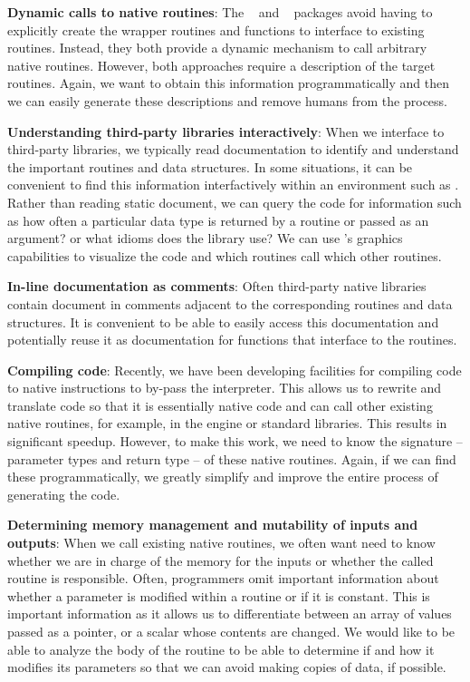 \documentclass[article]{jss}
\def\C{\proglang{C}}
\def\R{\proglang{R}}
\def\Rpkg#1{\pkg{#1}}
\begin{document}
\textbf{Dynamic calls to native routines}: The
\Rpkg{rdyncall}~\cite{bib:rdyncall} and \Rpkg{Rffi}~\cite{bib:Rffi}
\R{} packages avoid having to explicitly create the wrapper routines
and \R{} functions to interface to existing \C{} routines. Instead,
they both provide a dynamic mechanism to call arbitrary native
routines.  However, both approaches require a description of the
target routines.  Again, we want to obtain this information
programmatically and then we can easily generate these descriptions
and remove humans from the process.

\textbf{Understanding third-party libraries interactively}: When we
interface to third-party libraries, we typically read documentation to
identify and understand the important routines and data structures.
In some situations, it can be convenient to find this information
interfactively within an environment such as \R.  Rather than reading
static document, we can query the code for information such as how
often a particular data type is returned by a routine or passed as an
argument? or what idioms does the library use?  We can use \R's
graphics capabilities to visualize the code and which routines call
which other routines.

\textbf{In-line documentation as comments}: Often third-party native
libraries contain document in comments adjacent to the corresponding
routines and data structures.  It is convenient to be able to easily
access this documentation and potentially reuse it as \R{}
documentation for functions that interface to the routines.

\textbf{Compiling \R{} code}:  Recently, we have been developing \R{} facilities for compiling \R{}
code to native instructions to by-pass the \R{} interpreter.  This
allows us to rewrite and translate \R{} code so that it is essentially
native code and can call other existing native routines, for example,
in the \R{} engine or standard \C{} libraries.  This results in
significant speedup.  However, to make this work, we need to know the
signature -- parameter types and return type -- of these native
routines.  Again, if we can find these programmatically, we greatly
simplify and improve the entire process of generating the code.

\textbf{Determining memory management and mutability of inputs and
  outputs}: When we call existing native routines, we often want need
to know whether we are in charge of the memory for the inputs or
whether the called routine is responsible.  Often, programmers omit
important information about whether a parameter is modified within a
routine or if it is constant.  This is important information as it
allows us to differentiate between an array of values passed as a
pointer, or a scalar whose contents are changed.  We would like to be
able to analyze the body of the routine to be able to determine if and
how it modifies its parameters so that we can avoid making copies of
data, if possible.
\end{document}
